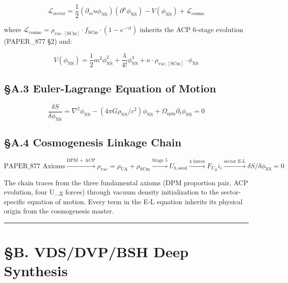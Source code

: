 \documentclass[12pt,a4paper]{article}
\begin{document}
\begin{equation}
\mathcal{L}_{\mathrm{sector}} = \frac{1}{2}(\partial_mu \phi_{\mathrm{NS}})(\partial^\mu \phi_{\mathrm{NS}}) - V(\phi_{\mathrm{NS}}) + \mathcal{L}_{\mathrm{cosmo}}
\end{equation}

where $\mathcal{L}_{\mathrm{cosmo}} = \rho_{\mathrm{vac,[SCm]}} \cdot f_{\mathrm{SCm}} \cdot (1 - e^{-\gamma t})$ inherits the ACP 6-stage evolution (PAPER\_877 \S{}2) and:

\begin{equation}
V(\phi_{\mathrm{NS}}) = \frac{1}{2} m^2 \phi_{\mathrm{NS}}^2 + \frac{\lambda}{4!} \phi_{\mathrm{NS}}^4 + \kappa \cdot \rho_{\mathrm{vac,[SCm]}} \cdot \phi_{\mathrm{NS}}
\end{equation}

\subsection{\S{}A.3 Euler-Lagrange Equation of Motion}

\begin{equation}
\boxed{\frac{\delta S}{\delta \phi_{\mathrm{NS}}} = \nabla^2 \phi_{\mathrm{NS}} - (4\pi G \rho_{\mathrm{NS}}/c^2)\phi_{\mathrm{NS}} + \Omega_{\mathrm{spin}} \partial_t \phi_{\mathrm{NS}} = 0}
\end{equation}

\subsection{\S{}A.4 Cosmogenesis Linkage Chain}

\begin{equation}
\text{PAPER\_877 Axioms} \xrightarrow{\text{DPM + ACP}} \rho_{\mathrm{vac}} = \rho_{\mathrm{UA}} + \rho_{\mathrm{SCm}} \xrightarrow{\text{Stage 5}} U_{b,\mathrm{seed}} \xrightarrow{\text{4 forces}} F_U_Bi_i \xrightarrow{\text{sector E-L}} \delta S/\delta \phi_{\mathrm{NS}} = 0
\end{equation}

The chain traces from the three fundamental axioms (DPM proportion pair, ACP evolution, four U\_g forces) through vacuum density initialization to the sector-specific equation of motion. Every term in the E-L equation inherits its physical origin from the cosmogenesis master.

\medskip\hrule\medskip

\section{\S{}B. VDS/DVP/BSH Deep Synthesis}
\end{document}

